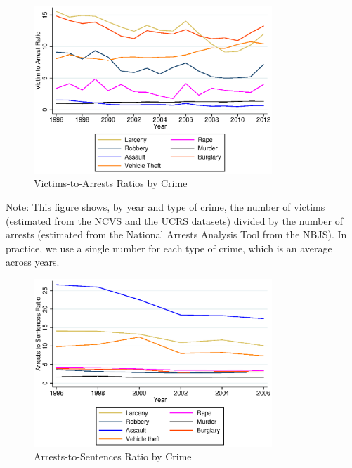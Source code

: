 \documentclass[static]{JJH-Beamer}
\begin{document}
\begin{frame}

\begin{figure} [H]
\caption{Victims-to-Arrests Ratios by Crime}\label{fig:victim1}
\begin{center}
\includegraphics[width=0.8\textwidth]{AppOutput/Crime/v-to-a-ratios}
\end{center}
\end{figure}

\end{frame}

{\flushleft \normalsize Note: This figure shows, by year and type of crime, the number of victims (estimated from the NCVS and the UCRS datasets) divided by the number of arrests (estimated from the National Arrests Analysis Tool from the NBJS). In practice, we use a single number for each type of crime, which is an average across years.\\}

\begin{frame}

\begin{figure} [H]
\caption{Arrests-to-Sentences Ratio by Crime}\label{fig:victim2}
\begin{center}
\includegraphics[width=0.8\textwidth]{AppOutput/Crime/a-to-s-ratios}
\end{center}
\end{figure}

\end{frame}
\end{document}

